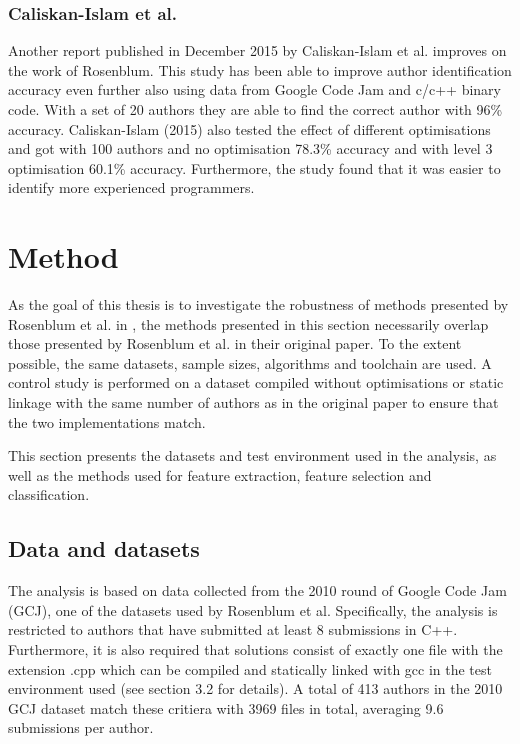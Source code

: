 \documentclass[a4paper,11pt]{kth-mag}
\begin{document}
\subsection{Caliskan-Islam et al.}
Another report published in December 2015 by Caliskan-Islam et al. improves on
the work of Rosenblum. This study has been able to improve author
identification accuracy even further also using data from Google Code Jam and
c/c++ binary code. With a set of 20 authors they are able to find the correct
author with 96\% accuracy. Caliskan-Islam (2015) also tested the effect of
different optimisations and got with 100 authors and no optimisation 78.3\%
accuracy and with level 3 optimisation 60.1\% accuracy. Furthermore, the study
found that it was easier to identify more experienced programmers.

\chapter{Method} \label{ch:method}
As the goal of this thesis is to investigate the robustness of methods
presented by Rosenblum et al. in \parencite{rosenblum2011wrote}, the methods
presented in this section necessarily overlap those presented by Rosenblum et
al. in their original paper. To the extent possible, the same datasets, sample
sizes, algorithms and toolchain are used. A control study is performed on a
dataset compiled without optimisations or static linkage with the same number
of authors as in the original paper to ensure that the two implementations
match. 

This section presents the datasets and test environment used in the analysis,
as well as the methods used for feature extraction, feature selection and
classification.

\section{Data and datasets} \label{data-datasets}
The analysis is based on data collected from the 2010 round of Google Code Jam
(GCJ), one of the datasets used by Rosenblum et al. Specifically, the analysis
is restricted to authors that have submitted at least 8 submissions in C++.
Furthermore, it is also required that solutions consist of exactly one file
with the extension .cpp which can be compiled and statically linked with gcc in
the test environment used (see section 3.2 for details). A total of 413 authors
in the 2010 GCJ dataset match these critiera with 3969 files in total,
averaging 9.6 submissions per author.
\end{document}
